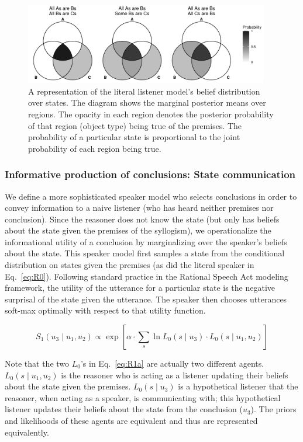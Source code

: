 \documentclass[floatsintext, man]{apa6}
\begin{document}
\begin{figure}[b]
    \centering
        \includegraphics[width = 0.95\textwidth]{venn_literal_AA1_AI1_AA2_exp.pdf}
    \caption{A representation of the literal listener model's belief distribution over states. The diagram shows the marginal posterior means over regions. The opacity in each region denotes the posterior probability of that region (object type) being true of the premises. The probability of a particular state is proportional to the joint probability of each region being true.}
    \label{fig:lit_state_qud}
\end{figure}



\subsubsection{Informative production of conclusions: State communication}

We define a more sophisticated speaker model who selects conclusions in order to convey information to a naive listener (who has heard neither premises nor conclusion). 
Since the reasoner does not know the state (but only has beliefs about the state given the premises of the syllogism), we operationalize the informational utility of a conclusion by marginalizing over the speaker's beliefs about the state.
This speaker model first samples a state from the conditional distribution on states given the premises (as did the literal speaker in Eq.~\ref{eq:R0}).
Following standard practice in the Rational Speech Act modeling framework, the utility of the utterance for a particular state is the negative surprisal of the state given the utterance.
The speaker then chooses utterances soft-max optimally with respect to that utility function.

\begin{equation}
S_1(u_3 \mid u_1, u_2) \propto \exp{ [ \alpha \cdot  \sum_s  \ln L_0(s \mid u_3) \cdot L_0(s \mid u_1, u_2) ] } \label{eq:R1a}
\end{equation}

Note that the two $L_0$'s in Eq.~\ref{eq:R1a} are actually two different agents.
$L_0(s \mid u_1, u_2)$ is the reasoner who is acting as a listener updating their beliefs about the state given the premises.
$L_0(s \mid u_3)$ is a hypothetical listener that the reasoner, when acting as a speaker, is communicating with; this hypothetical listener updates their beliefs about the state from the conclusion ($u_3$).
The priors and likelihoods of these agents are equivalent and thus are represented equivalently. 
\end{document}
